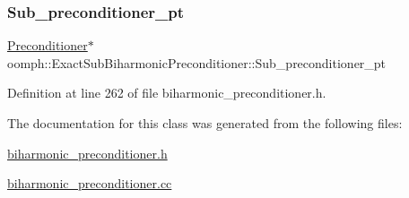 \mbox{\label{classoomph_1_1ExactSubBiharmonicPreconditioner_aa6ff92b55858721d83cf933d39484ed3}} 
\subsubsection{\texorpdfstring{Sub\+\_\+preconditioner\+\_\+pt}{Sub\_preconditioner\_pt}}
{\footnotesize\ttfamily \hyperlink{classoomph_1_1Preconditioner}{Preconditioner}$\ast$ oomph\+::\+Exact\+Sub\+Biharmonic\+Preconditioner\+::\+Sub\+\_\+preconditioner\+\_\+pt}



Definition at line 262 of file biharmonic\+\_\+preconditioner.\+h.



The documentation for this class was generated from the following files\+:\begin{DoxyCompactItemize}
\item 
\hyperlink{biharmonic__preconditioner_8h}{biharmonic\+\_\+preconditioner.\+h}\item 
\hyperlink{biharmonic__preconditioner_8cc}{biharmonic\+\_\+preconditioner.\+cc}\end{DoxyCompactItemize}
